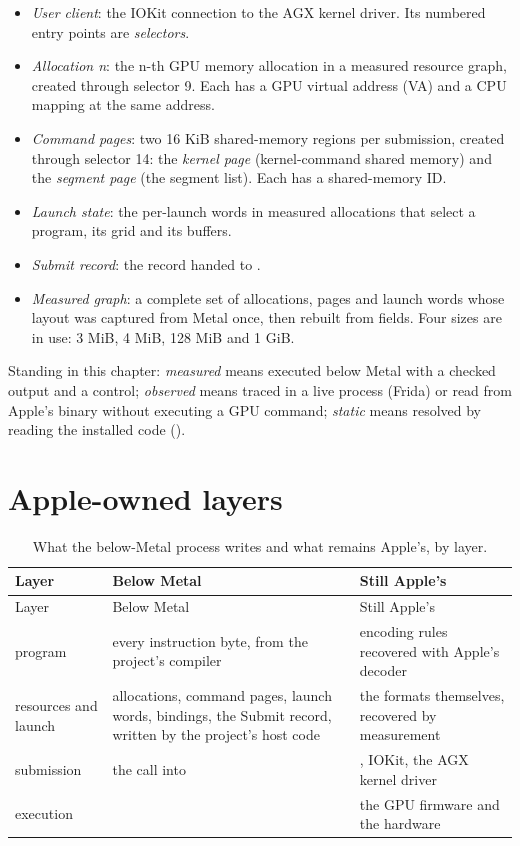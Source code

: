 \begin{itemize}
\item \emph{User client}: the IOKit connection to the AGX kernel driver. Its numbered entry points are \emph{selectors}.
\item \emph{Allocation n}: the n-th GPU memory allocation in a measured resource graph, created through selector 9. Each has a
  GPU virtual address (VA) and a CPU mapping at the same address.
\item \emph{Command pages}: two 16 KiB shared-memory regions per submission, created through selector 14: the \emph{kernel page}
  (kernel-command shared memory) and the \emph{segment page} (the segment list). Each has a shared-memory ID.
\item \emph{Launch state}: the per-launch words in measured allocations that select a program, its grid and its buffers.
\item \emph{Submit record}: the record handed to .
\item \emph{Measured graph}: a complete set of allocations, pages and launch words whose layout was captured from Metal once,
  then rebuilt from fields. Four sizes are in use: 3 MiB, 4 MiB, 128 MiB and 1 GiB.
\end{itemize}

Standing in this chapter: \emph{measured} means executed below Metal with a checked output and a control; \emph{observed} means
traced in a live process (Frida) or read from Apple's binary without executing a GPU command; \emph{static} means resolved by
reading the installed  code ().

\section{Apple-owned layers}\label{sec:stays-apple-s}

\begin{xltabular}{\linewidth}{@{}>{\hsize}X>{\hsize}X>{\hsize}X@{}}
\caption{What the below-Metal process writes and what remains Apple's, by layer.}\label{tab:apple-layers}\\
\toprule
Layer & Below Metal & Still Apple's \\
\midrule
\endfirsthead
{}
\toprule
Layer & Below Metal & Still Apple's \\
\midrule
\endhead
program & every instruction byte, from the project's compiler & encoding rules recovered with Apple's decoder \\*
resources and launch & allocations, command pages, launch words, bindings, the Submit record,
written by the project's host code & the formats themselves, recovered by measurement \\*
submission & the call into  & , IOKit, the AGX kernel driver \\*
execution &  & the GPU firmware and the hardware \\*
\bottomrule
\end{xltabular}


